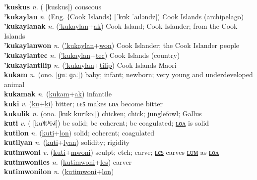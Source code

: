 \textbf{'kuskus} \textit{n.} ( [kuskus])
couscous \label{'kuskus} \\
\textbf{'kukaylan} \textit{n.} (Eng. ⟨Cook Islands⟩ [ˈkʊk ˈaɪləndz])
Cook Islands (archipelago) \label{'kukaylan} \\
\textbf{'kukaylanak} \textit{n.} (\hyperref['kukaylan]{'kukaylan}+\hyperref[ak]{ak})
Cook Island; Cook Islander; from the Cook Islands \label{'kukaylanak} \\
\textbf{'kukaylanwon} \textit{n.} (\hyperref['kukaylan]{'kukaylan}+\hyperref[won]{won})
Cook Islander; the Cook Islander people \label{'kukaylanwon} \\
\textbf{'kukaylantec} \textit{n.} (\hyperref['kukaylan]{'kukaylan}+\hyperref[tec]{tec})
Cook Islands (country) \label{'kukaylantec} \\
\textbf{'kukaylantilip} \textit{n.} (\hyperref['kukaylan]{'kukaylan}+\hyperref[tilip]{tilip})
Cook Islands Maori \label{'kukaylantilip} \\
\textbf{kukam} \textit{n.} (ono. [ɡuː ɡaː])
baby; infant; newborn; very young and underdeveloped animal \label{kukam} \\
\textbf{kukamak} \textit{n.} (\hyperref[kukam]{kukam}+\hyperref[ak]{ak})
infantile \label{kukamak} \\
\textbf{kuki} \textit{v.} (\hyperref[ku]{ku}+\hyperref[ki]{ki})
bitter; ʟєꜱ makes ʟᴏᴧ become bitter \label{kuki} \\
\textbf{kukulik} \textit{n.} (ono. [kuk kurikoː])
chicken; chick; junglefowl; Gallus \label{kukulik} \\
\textbf{kuti} \textit{v.} ( [ku˥˩tʰi˧˩˧])
be solid; be coherent; be coagulated; \hyperref[kutilon]{ʟᴏᴧ} is solid \label{kuti} \\
\textbf{kutilon} \textit{n.} (\hyperref[kuti]{kuti}+\hyperref[lon]{lon})
solid; coherent; coagulated \label{kutilon} \\
\textbf{kutilyan} \textit{n.} (\hyperref[kuti]{kuti}+\hyperref[lyan]{lyan})
solidity; rigidity \label{kutilyan} \\
\textbf{kutimwoni} \textit{v.} (\hyperref[kuti]{kuti}+\hyperref[mwoni]{mwoni})
sculpt; etch; carve; \hyperref[kutimwoniles]{ʟєꜱ} carves \hyperref[kutimwonilum]{ʟᴜᴍ} as \hyperref[kutimwonilon]{ʟᴏᴧ} \label{kutimwoni} \\
\textbf{kutimwoniles} \textit{n.} (\hyperref[kutimwoni]{kutimwoni}+\hyperref[les]{les})
carver \label{kutimwoniles} \\
\textbf{kutimwonilon} \textit{n.} (\hyperref[kutimwoni]{kutimwoni}+\hyperref[lon]{lon})
